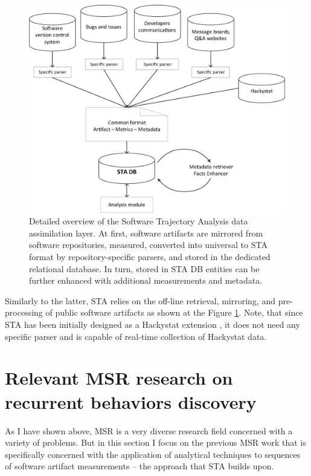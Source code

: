 \begin{figure}[t]
   \centering
   \includegraphics[width=115mm]{figures/Flow.eps}
   \caption{Detailed overview of the Software Trajectory Analysis data assimilation layer. 
    At first, software artifacts are mirrored from software repositories, measured, converted into 
    universal to STA format by repository-specific parsers, and stored in the dedicated relational database.
    In turn, stored in STA DB entities can be further enhanced with additional measurements and metadata.}
   \label{fig:sta-assimilation}
\end{figure}

Similarly to the latter, STA relies on the off-line retrieval, mirroring, and pre-processing of public software artifacts as
shown at the Figure \ref{fig:sta-assimilation}. Note, that since STA has been initially designed as a Hackystat extension 
\cite{csdl2-10-09}, it does not need any specific parser and is capable of real-time collection of Hackystat data.

\section{Relevant MSR research on recurrent behaviors discovery}
As I have shown above, MSR is a very diverse research field concerned with a variety of problems. 
But in this section I focus on the previous MSR work that is specifically concerned with the application of analytical 
techniques to sequences of software artifact measurements -- the approach that STA builds upon.

